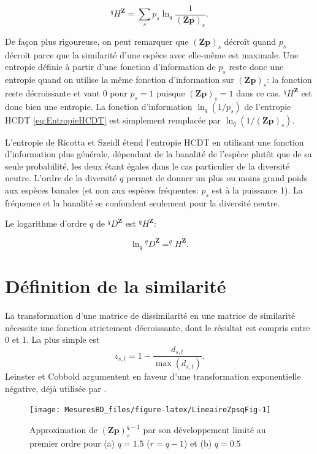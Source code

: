 \documentclass[
  11pt,
  french,
  a4paper,
  extrafontsizes,onecolumn,openright
  ]{memoir}
\begin{document}
\begin{equation}
  \label{eq:Ricotta2006bHZ}
  ^q\!H^{\mathbf{Z}} = \sum_s{p_{s}\ln_q{\frac{1}{\left(\mathbf{Zp}\right)_s}}}.
\end{equation}

De façon plus rigoureuse, on peut remarquer que \({(\mathbf{Zp})}_s\) décroît quand \(p_s\) décroît parce que la similarité d'une espèce avec elle-même est maximale.
Une entropie définie à partir d'une fonction d'information de \(p_s\) reste donc une entropie quand on utilise la même fonction d'information sur \({(\mathbf{Zp})}_s\): la fonction reste décroissante et vaut 0 pour \(p_s=1\) puisque \({(\mathbf{Zp})}_s=1\) dans ce cas.
\(^q\!H^{\mathbf{Z}}\) est donc bien une entropie.
La fonction d'information \(\ln_q(1/p_s)\) de l'entropie HCDT \eqref{eq:EntropieHCDT} est simplement remplacée par \(\ln_q(1/{(\mathbf{Zp})}_s)\).

L'entropie de Ricotta et Szeidl étend l'entropie HCDT en utilisant une fonction d'information plus générale, dépendant de la banalité de l'espèce plutôt que de sa seule probabilité, les deux étant égales dans le cas particulier de la diversité neutre.
L'ordre de la diversité \(q\) permet de donner un plus ou moins grand poids aux espèces banales (et non aux espèces fréquentes: \(p_s\) est à la puissance 1).
La fréquence et la banalité se confondent seulement pour la diversité neutre.

Le logarithme d'ordre \(q\) de \(^q\!D^{\mathbf{Z}}\) est \(^q\!H^{\mathbf{Z}}\):

\begin{equation}
  \label{eq:DqZHqZ}
  \ln_q{^q\!D^{\mathbf{Z}}} = ^q\!H^{\mathbf{Z}}.
\end{equation}

\section{Définition de la similarité}\label{duxe9finition-de-la-similarituxe9}

La transformation d'une matrice de dissimilarité en une matrice de similarité nécessite une fonction strictement décroissante, dont le résultat est compris entre 0 et 1.
La plus simple est
\[z_{s,t} = 1 - \frac{d_{s,t}}{\max{(d_{s,t})}}.\]
Leinster et Cobbold argumentent en faveur d'une transformation exponentielle négative, déjà utilisée par \textcite{Nei1972}.



\scriptsize

\begin{figure}

{\centering \texttt{[image: MesuresBD\_files/figure-latex/LineaireZpsqFig-1]} 

}

\caption{Approximation de \({(\mathbf{Zp})}_{s}^{q-1}\) par son développement limité au premier ordre pour (a) \(q=1.5\) (\(r=q-1\)) et (b) \(q=0.5\)}\label{fig:LineaireZpsqFig}
\end{figure}
\end{document}
